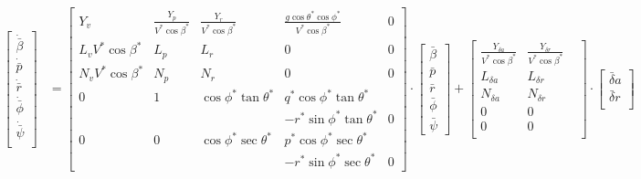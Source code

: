 \documentclass{article}
\begin{document}
\begin{align*}
\begin{bmatrix}
\dot{\bar{\beta}} \\
\dot{\bar{p}} \\
\dot{\bar{r}} \\
\dot{\bar{\phi}} \\
\dot{\bar{\psi}} \\
\end{bmatrix} &= 
\begin{bmatrix}
Y_v & \frac{Y_p}{V^* \cos \beta^*} & \frac{Y_r}{V^* \cos \beta^*} & \frac{g \cos \theta^* \cos \phi^*}{V^* \cos \beta^*} & 0 \\
L_v V^* \cos \beta^* & L_p & L_r & 0 & 0 \\
N_v V^* \cos \beta^* & N_p & N_r & 0 & 0 \\
0 & 1 & \cos \phi^* \tan \theta^* & q^* \cos \phi^* \tan \theta^* \\
& & & -r^* \sin \phi^* \tan \theta^*  & 0 \\
0 & 0 & \cos \phi^* \sec \theta^* & p^* \cos \phi^* \sec \theta^* \\
& & & -r^* \sin \phi^* \sec \theta^*  & 0
\end{bmatrix}
\cdot
\begin{bmatrix}
\bar{\beta} \\
\bar{p} \\
\bar{r} \\
\bar{\phi} \\
\bar{\psi} 
\end{bmatrix} 
+
\begin{bmatrix}
\frac{Y_{\delta a}}{V^* \cos \beta^*} & \frac{Y_{\delta r}}{V^* \cos \beta^*} \\
L_{\delta a} & L_{\delta r} & \\
N_{\delta a} & N_{\delta r} & \\
0 & 0 \\
0 & 0 \\
\end{bmatrix} \cdot
\begin{bmatrix}
\bar{\delta} a\\
\bar{\delta} r\\
\end{bmatrix}
\end{align*}
\end{document}
